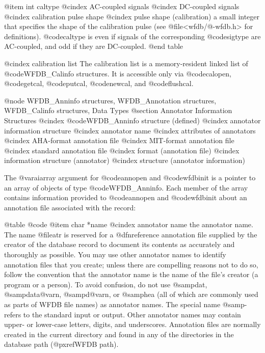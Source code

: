 {{{{{{{{{{@item int caltype
@cindex AC-coupled signals
@cindex DC-coupled signals
@cindex calibration pulse shape
@cindex pulse shape (calibration)
a small integer that specifies the shape of the calibration pulse (see
@file{<wfdb/@-wfdb.h>} for definitions).  @code{caltype} is even if signals of
the corresponding @code{sigtype} are AC-coupled, and odd if they are
DC-coupled.
@end table

@cindex calibration list
The calibration list is a memory-resident linked list of @code{WFDB_Calinfo}
structures.  It is accessible only via @code{calopen}, @code{getcal},
@code{putcal}, @code{newcal}, and @code{flushcal}.

@node WFDB_Anninfo structures, WFDB_Annotation structures, WFDB_Calinfo structures, Data Types
@section Annotator Information Structures
@cindex @code{WFDB_Anninfo} structure (defined)
@cindex annotator information structure
@cindex annotator name
@cindex attributes of annotators
@cindex AHA-format annotation file
@cindex MIT-format annotation file
@cindex standard annotation file
@cindex format (annotation file)
@cindex information structure (annotator)
@cindex structure (annotator information)

The @var{aiarray} argument for @code{annopen} and @code{wfdbinit} is a
pointer to an array of objects of type @code{WFDB_Anninfo}.  Each member
of the array contains information provided to @code{annopen} and
@code{wfdbinit} about an annotation file associated with the
record:

@table @code
@item char *name
@cindex annotator name
the annotator name.  The name @file{atr} is reserved for a @dfn{reference
annotation file} supplied by the creator of the database record to document its
contents as accurately and thoroughly as possible.  You may use other annotator
names to identify annotation files that you create; unless there are compelling
reasons not to do so, follow the convention that the annotator name is the name
of the file's creator (a program or a person).  To avoid confusion, do not use
@samp{dat}, @samp{data@var{n}}, @samp{d@var{n}}, or @samp{hea}
(all of which are commonly used as parts of WFDB file names) as annotator
names.  The special name @samp{-} refers to the standard input or output.
Other annotator names may contain upper- or lower-case letters, digits, and
underscores.  Annotation files are normally created in the current directory
and found in any of the directories in the database path (@pxref{WFDB path}).

}}}}}}}}}}

